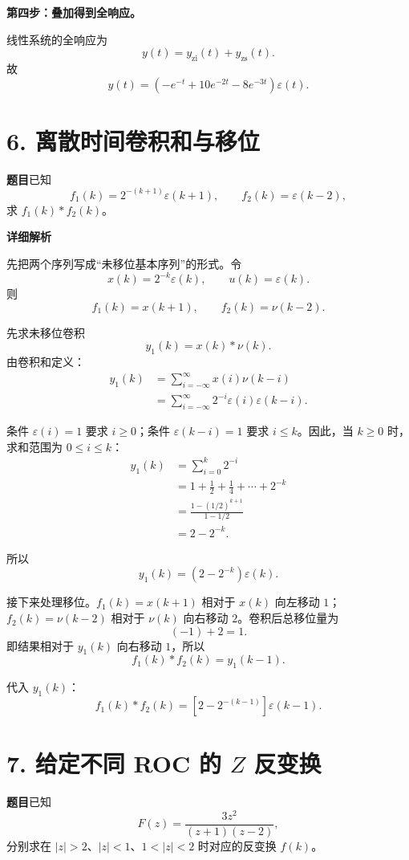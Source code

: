 \documentclass[12pt,a4paper]{ctexart}
\newcommand{\eps}{\varepsilon}
\begin{document}
\textbf{第四步：叠加得到全响应。}

线性系统的全响应为
\[
y(t)=y_{\mathrm{zi}}(t)+y_{\mathrm{zs}}(t).
\]
故
\[
\boxed{
y(t)=
\left(-e^{-t}+10e^{-2t}-8e^{-3t}\right)\eps(t).}
\]

\newpage
\section*{6. 离散时间卷积和与移位}

\textbf{题目}\quad 已知
\[
f_1(k)=2^{-(k+1)}\eps(k+1),
\qquad
f_2(k)=\eps(k-2),
\]
求 \(\displaystyle f_1(k)*f_2(k)\)。

\textbf{详细解析}

先把两个序列写成“未移位基本序列”的形式。令
\[
x(k)=2^{-k}\eps(k),
\qquad
u(k)=\eps(k).
\]
则
\[
f_1(k)=x(k+1),
\qquad
f_2(k)=\nu(k-2).
\]

先求未移位卷积
\[
y_1(k)=x(k)*\nu(k).
\]
由卷积和定义：
\begin{align*}
y_1(k)
&=\sum_{i=-\infty}^{\infty}x(i)\nu(k-i)\\
&=\sum_{i=-\infty}^{\infty}2^{-i}\eps(i)\eps(k-i).
\end{align*}

条件 \(\eps(i)=1\) 要求 $i\geq0$；条件 \(\eps(k-i)=1\) 要求 $i\leq k$。因此，当 $k\geq0$ 时，求和范围为 $0\leq i\leq k$：
\begin{align*}
y_1(k)
&=\sum_{i=0}^{k}2^{-i}\\
&=1+\frac12+\frac14+\cdots+2^{-k}\\
&=\frac{1-(1/2)^{k+1}}{1-1/2}\\
&=2-2^{-k}.
\end{align*}

所以
\[
y_1(k)=\left(2-2^{-k}\right)\eps(k).
\]

接下来处理移位。$f_1(k)=x(k+1)$ 相对于 $x(k)$ 向左移动 $1$；$f_2(k)=\nu(k-2)$ 相对于 $\nu(k)$ 向右移动 $2$。卷积后总移位量为
\[
(-1)+2=1.
\]
即结果相对于 $y_1(k)$ 向右移动 $1$，所以
\[
f_1(k)*f_2(k)=y_1(k-1).
\]

代入 $y_1(k)$：
\[
\boxed{
f_1(k)*f_2(k)
=\left[2-2^{-(k-1)}\right]\eps(k-1).}
\]

\newpage
\section*{7. 给定不同 ROC 的 $Z$ 反变换}

\textbf{题目}\quad 已知
\[
F(z)=\frac{3z^2}{(z+1)(z-2)},
\]
分别求在 \(\displaystyle |z|>2\)、\(\displaystyle |z|<1\)、\(\displaystyle 1<|z|<2\) 时对应的反变换 $f(k)$。
\end{document}
